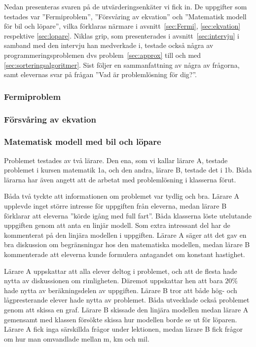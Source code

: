\textcolor{lila}{Nedan presenteras svaren på de utvärderingsenkäter vi fick in. De uppgifter som testades var ''Fermiproblem'', ''Försvåring av ekvation'' och ''Matematisk modell för bil och löpare'', vilka förklaras närmare i avsnitt~\ref{sec:Fermi}, \ref{sec:ekvation} respektive \ref{sec:lopare}. Niklas grip, som presenterades i avsnitt~\ref{sec:intervju} i samband med den intervju han medverkade i, testade också några av programmeringsproblemen dvs problem~\ref{sec:approx} till och med \ref{sec:sorteringsalgoritmer}. Sist följer en sammanfattning av några av frågorna, samt elevernas svar på frågan ''Vad är problemlösning för dig?''.}

\subsubsection{Fermiproblem}
    \label{resultat:Fermi}

\subsubsection{Försvåring av ekvation}
    \label{resultat:Ekvation}

    \subsubsection{Matematisk modell med bil och löpare}
        \label{resultat:Lopare}
    
        \textcolor{lila}{Problemet testades av två lärare. Den ena, som vi kallar lärare A, testade problemet i kursen matematik 1a, och den andra, lärare B, testade det i 1b. Båda lärarna har även angett att de arbetat med problemlösning i klasserna förut.}
    
        \textcolor{lila}{Båda två tyckte att informationen om problemet var tydlig och bra. Lärare A upplevde inget större intresse för uppgiften från eleverna, medan lärare B förklarar att eleverna ''körde igång med full fart''. Båda klasserna löste utelutande uppgiften genom att anta en linjär modell. Som extra intressant del har de kommenterat på den linjära modellen i uppgiften. Lärare A säger att det gav en bra diskussion om begränsningar hos den matematiska modellen, medan lärare B kommenterade att eleverna kunde formulera antagandet om konstant hastighet.}
    
        \textcolor{lila}{Lärare A uppskattar att alla elever deltog i problemet, och att de flesta hade nytta av diskussionen om rimligheten. Däremot uppskattar hen att bara $20\%$ hade nytta av beräkningsdelen av uppgiften. Lärare B tror att både hög- och lågpresterande elever hade nytta av problemet. Båda utvecklade också problemet genom att skissa en graf. Lärare B skissade den linjära modellen medan lärare A gemensamt med klassen försökte skissa hur modellen borde se ut för löparen. Lärare A fick inga särskillda frågor under lektionen, medan lärare B fick frågor om hur man omvandlade mellan m, km och mil.}
    
